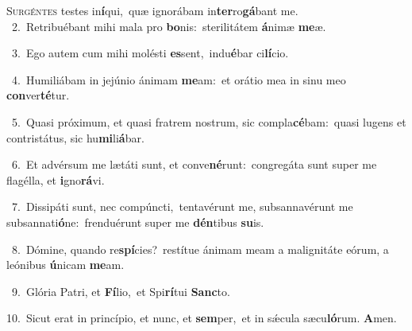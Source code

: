 \lettrine{\initial\textcolor{\initialcolor}{S}}{urgéntes} testes in\-\textbf{í}\-qui,~\star quæ ignorábam in\-\textbf{ter}\-ro\-\textbf{gá}\-bant me.\\
{\numbfont\textcolor{\numbcolor}{~2.}}~Retribuébant mihi mala pro \textbf{bo}\-nis:~\star sterilitátem \textbf{á}\-nimæ \textbf{me}\-æ.\par
{\numbfont\textcolor{\numbcolor}{~3.}}~Ego autem cum mihi molésti \textbf{es}\-sent,~\star indu\-\textbf{é}\-bar ci\-\textbf{lí}\-cio.\par
{\numbfont\textcolor{\numbcolor}{~4.}}~Humiliábam in jejúnio ánimam \textbf{me}\-am:~\star et orátio mea in sinu meo \textbf{con}\-ver\-\textbf{té}\-tur.\par
{\numbfont\textcolor{\numbcolor}{~5.}}~Quasi próximum, et quasi fratrem nostrum, sic compla\-\textbf{cé}\-bam:~\star quasi lugens et contristátus, sic hu\-\textbf{mi}\-li\-\textbf{á}\-bar.\par
{\numbfont\textcolor{\numbcolor}{~6.}}~Et advérsum me lætáti sunt, et conve\-\textbf{né}\-runt:~\star congregáta sunt super me flagélla, et \textbf{i}\-gno\-\textbf{rá}\-vi.\par
{\numbfont\textcolor{\numbcolor}{~7.}}~Dissipáti sunt, nec compúncti,~\dagger tentavérunt me, subsannavérunt me subsannati\-\textbf{ó}\-ne:~\star frenduérunt super me \textbf{dén}\-tibus \textbf{su}\-is.\par
{\numbfont\textcolor{\numbcolor}{~8.}}~Dómine, quando re\-\textbf{spí}\-cies?~\star restítue ánimam meam a malignitáte eórum, a leónibus \textbf{ú}\-nicam \textbf{me}\-am.\par
{\numbfont\textcolor{\numbcolor}{~9.}}~Glória Patri, et \textbf{Fí}\-lio,~\star et Spi\-\textbf{rí}\-tui \textbf{Sanc}\-to.\par
{\numbfont\textcolor{\numbcolor}{10.}}~Sicut erat in princípio, et nunc, et \textbf{sem}\-per,~\star et in sǽcula sæcu\-\textbf{ló}\-rum. \textbf{A}\-men.\par
